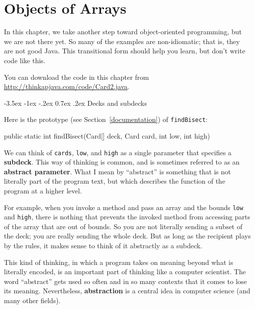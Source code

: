 \documentclass[12pt]{book}
\title{\thetitle}
\author{\theauthors}
\date{\theversion}
\makeatletter
\renewcommand{\section}{\@startsection {section}{1}{\z@}%
    {-3.5ex \@plus -1ex \@minus -.2ex}%
    {0.7ex \@plus.2ex}%
    {\normalfont\Large\bfseries}}
\theoremstyle{exercise}
\newcommand{\java}[1]{\lstinline{#1}} %
\makeatother
\begin{document}
\setcounter{chapter}{12}


\chapter{Objects of Arrays}


In this chapter, we take another step toward object-oriented programming, but we are not there yet.
So many of the examples are non-idiomatic; that is, they are not good Java.
This transitional form should help you learn, but don't write code like this.

You can download the code in this chapter from \url{http://thinkapjava.com/code/Card2.java}.


\section{Decks and subdecks}

Here is the prototype (see Section~\ref{documentation}) of \java{findBisect}:

\begin{code}
public static int findBisect(Card[] deck, Card card, int low, int high)
\end{code}


We can think of \java{cards}, \java{low}, and \java{high} as a single parameter that specifies a {\bf subdeck}.
This way of thinking is common, and is sometimes referred to as an {\bf abstract parameter}.
What I mean by ``abstract'' is something that is not literally part of the program text, but which describes the function of the program at a higher level.

For example, when you invoke a method and pass an array and the bounds \java{low} and \java{high}, there is nothing that prevents the invoked method from accessing parts of the array that are out of bounds.
So you are not literally sending a subset of the deck; you are really sending the whole deck.
But as long as the recipient plays by the rules, it makes sense to think of it abstractly as a subdeck.

This kind of thinking, in which a program takes on meaning beyond what is literally encoded, is an important part of thinking like a computer scientist.
The word ``abstract'' gets used so often and in so many contexts that it comes to lose its meaning.
Nevertheless, {\bf abstraction} is a central idea in computer science (and many other fields).
\end{document}
